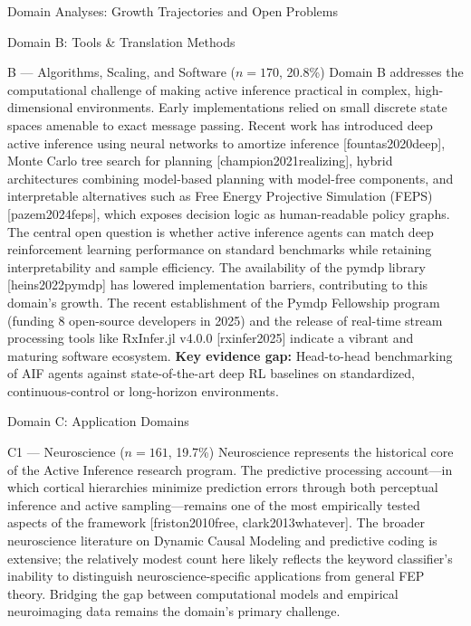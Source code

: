\documentclass[
  ignorenonframetext,
]{beamer}
\providecommand{\citep}[1]{[#1]}
\begin{document}
\begin{frame}[allowframebreaks]{Domain Analyses: Growth Trajectories and
Open Problems \label{sec:subfield_analyses}}
\begin{block}{Domain B: Tools \& Translation Methods}
\protect{}\label{domain-b-tools-translation-methods}
\begin{block}{B --- Algorithms, Scaling, and Software (\(n = 170\),
20.8\%)}
\protect{}\label{b-algorithms-scaling-and-software-n-170-20.8}
Domain B addresses the computational challenge of making active
inference practical in complex, high-dimensional environments. Early
implementations relied on small discrete state spaces amenable to exact
message passing. Recent work has introduced deep active inference using
neural networks to amortize inference \citep{fountas2020deep}, Monte
Carlo tree search for planning \citep{champion2021realizing}, hybrid
architectures combining model-based planning with model-free components,
and interpretable alternatives such as Free Energy Projective Simulation
(FEPS) \citep{pazem2024feps}, which exposes decision logic as
human-readable policy graphs. The central open question is whether
active inference agents can match deep reinforcement learning
performance on standard benchmarks while retaining interpretability and
sample efficiency. The availability of the pymdp library
\citep{heins2022pymdp} has lowered implementation barriers, contributing
to this domain's growth. The recent establishment of the Pymdp
Fellowship program (funding 8 open-source developers in 2025) and the
release of real-time stream processing tools like RxInfer.jl v4.0.0
\citep{rxinfer2025} indicate a vibrant and maturing software ecosystem.
\textbf{Key evidence gap:} Head-to-head benchmarking of AIF agents
against state-of-the-art deep RL baselines on standardized,
continuous-control or long-horizon environments.
\end{block}
\end{block}

\begin{block}{Domain C: Application Domains}
\protect{}\label{domain-c-application-domains}
\begin{block}{C1 --- Neuroscience (\(n = 161\), 19.7\%)}
\protect{}\label{c1-neuroscience-n-161-19.7}
Neuroscience represents the historical core of the Active Inference
research program. The predictive processing account---in which cortical
hierarchies minimize prediction errors through both perceptual inference
and active sampling---remains one of the most empirically tested aspects
of the framework \citep{friston2010free, clark2013whatever}. The broader
neuroscience literature on Dynamic Causal Modeling and predictive coding
is extensive; the relatively modest count here likely reflects the
keyword classifier's inability to distinguish neuroscience-specific
applications from general FEP theory. Bridging the gap between
computational models and empirical neuroimaging data remains the
domain's primary challenge.
\end{block}


\end{block}
\end{frame}
\end{document}
